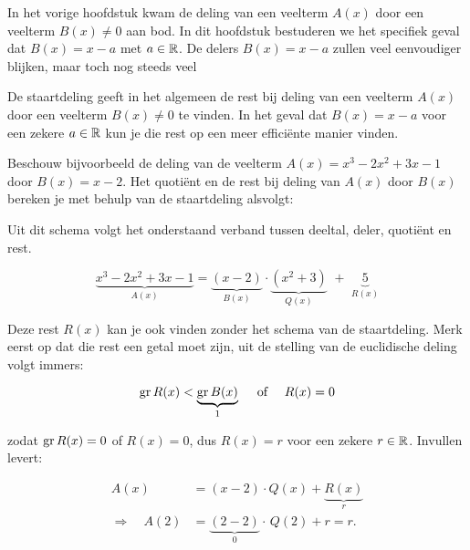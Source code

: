 \documentclass{ximera}
\begin{document}
	\author{Koen de Naeghel - Wiskunde Op Maat}
    \xmsource

In het vorige hoofdstuk kwam de deling van een veelterm \(A(x)\) door een veelterm \(B(x) \neq 0\) aan bod. In dit hoofdstuk bestuderen we het specifiek geval dat \(B(x) = x-a\) met \(a \in \mathbb{R}\). De delers \(B(x) = x-a\) zullen veel eenvoudiger blijken, maar toch nog steeds veel 



De staartdeling geeft in het algemeen de rest bij deling van een veelterm \(A(x)\) door een veelterm \(B(x) \neq 0\) te vinden. In het geval dat \(B(x) = x-a\) voor een zekere \(a \in \mathbb{R}\) kun je die rest op een meer efficiënte manier vinden.

Beschouw bijvoorbeeld de deling van de veelterm \(A(x) = x^3-2x^2+3x-1\) door \(B(x) = x-2\). Het quotiënt en de rest bij deling van \(A(x)\) door \(B(x)\) bereken je met behulp van de staartdeling alsvolgt:




Uit dit schema volgt het onderstaand verband tussen deeltal, deler, quotiënt en rest.

\[
\underbrace{x^3-2x^2+3x-1}_{A(x)} = \underbrace{(x-2)}_{B(x)}\cdot\underbrace{(x^2+3)}_{Q(x)} \,\, + \,\, \underbrace{5}_{R(x)} 
\]

Deze rest \(R(x)\) kan je ook vinden zonder het schema van de staartdeling. Merk eerst op dat die rest een getal moet zijn, uit de stelling van de euclidische deling volgt immers: 

\[
\operatorname{gr} R(x) < \underbrace{\operatorname{gr} B(x)}_{1} \quad \text{ of } \quad R(x) = 0
\]

zodat \(\operatorname{gr} R(x) = 0\) of \(R(x) = 0\), dus \(R(x) = r\) voor een zekere \(r \in \mathbb{R}\). Invullen levert:

\begin{align*}
A(x) & = (x-2) \cdot Q(x) + \underbrace{R(x)}_{r} \\
\Rightarrow \quad A(2) & = \underbrace{(2-2)}_{0} \cdot \, Q(2) + r = r. 
\end{align*}
\end{document}
